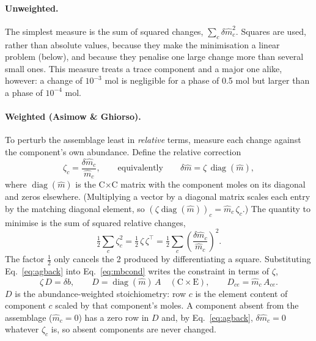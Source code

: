 \documentclass[11pt]{article}
\begin{document}
\paragraph{Unweighted.} The simplest measure is the sum of squared changes,
$\sum_c \delta\hat m_c^2$. Squares are used, rather than absolute values, because they make
the minimisation a linear problem (below), and because they penalise one large change more
than several small ones. This measure treats a trace component and a major one alike,
however: a change of $10^{-3}$ mol is negligible for a phase of 0.5 mol but larger than a
phase of $10^{-4}$ mol.

\paragraph{Weighted (Asimow \& Ghiorso).} To perturb the assemblage least in
\emph{relative} terms, measure each change against the component's own abundance. Define
the relative correction
\begin{equation}
  \zeta_c = \frac{\delta\hat m_c}{\hat m_c},
  \qquad\text{equivalently}\qquad
  \delta\hat m = \zeta\, \operatorname{diag}(\hat m),
  \label{eq:agback}
\end{equation}
where $\operatorname{diag}(\hat m)$ is the C$\times$C matrix with the component moles on its
diagonal and zeros elsewhere. (Multiplying a vector by a diagonal matrix scales each entry
by the matching diagonal element, so $(\zeta\operatorname{diag}(\hat m))_c = \hat m_c\,\zeta_c$.)
The quantity to minimise is the sum of squared relative changes,
\begin{equation}
  \tfrac12 \sum_c \zeta_c^2 = \tfrac12\, \zeta\, \zeta^{\!\top}
  = \tfrac12 \sum_c \left(\frac{\delta\hat m_c}{\hat m_c}\right)^{\!2}.
  \label{eq:mbobj}
\end{equation}
The factor $\tfrac12$ only cancels the 2 produced by differentiating a square. Substituting
Eq.~\eqref{eq:agback} into Eq.~\eqref{eq:mbcond} writes the constraint in terms of $\zeta$,
\begin{equation}
  \zeta\, D = \delta b,
  \qquad
  D = \operatorname{diag}(\hat m)\, A \quad (\text{C}\times\text{E}),
  \qquad
  D_{ce} = \hat m_c\, A_{ce} .
  \label{eq:agweighted}
\end{equation}
$D$ is the abundance-weighted stoichiometry: row $c$ is the element content of component
$c$ scaled by that component's moles. A component absent from the assemblage
($\hat m_c = 0$) has a zero row in $D$ and, by Eq.~\eqref{eq:agback}, $\delta\hat m_c = 0$
whatever $\zeta_c$ is, so absent components are never changed.
\end{document}
